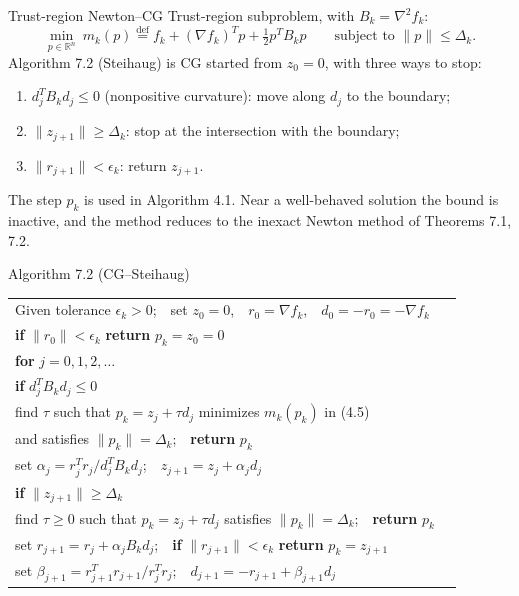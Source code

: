 \documentclass[aspectratio=169,12pt]{beamer}
\makeatletter
\newcommand{\R}{\mathbb{R}}
\newcommand{\gradf}{\nabla f}
\newcommand{\hessf}{\nabla^{2} f}
\newenvironment{algo}{\par\renewcommand{\arraystretch}{1.12}%
  \begin{tabular}{@{}l@{\hspace{2.2em}}l@{}}}{\end{tabular}\par}
\makeatother
\begin{document}
\begin{frame}{Trust-region Newton--CG}
  Trust-region subproblem, with $B_{k}=\hessf_{k}$:
  \[
    \min_{p\in\R^{n}}\ m_{k}(p)\overset{\text{def}}{=}f_{k}+(\gradf_{k})^{T}p+\tfrac12p^{T}B_{k}p
    \qquad\text{subject to }\|p\|\le\Delta_{k} .
    \tag{7.11}
  \]
  Algorithm 7.2 (Steihaug) is CG started from $z_{0}=0$, with three ways to stop:
  \begin{enumerate}\setlength\itemsep{0.3em}
    \item $d_{j}^{T}B_{k}d_{j}\le 0$ (nonpositive curvature): move along $d_{j}$ to the boundary;
    \item $\|z_{j+1}\|\ge\Delta_{k}$: stop at the intersection with the boundary;
    \item $\|r_{j+1}\|<\epsilon_{k}$: return $z_{j+1}$.
  \end{enumerate}

  \vspace{0.3em}
  The step $p_{k}$ is used in Algorithm 4.1. Near a well-behaved solution the bound is
  inactive, and the method reduces to the inexact Newton method of Theorems 7.1, 7.2.
\end{frame}

\begin{frame}{Algorithm 7.2 (CG--Steihaug)}
  \begin{block}{}\small
    \begin{algo}
      Given tolerance $\epsilon_{k}>0$;\ \ set $z_{0}=0$,\ \ $r_{0}=\gradf_{k}$,\ \ $d_{0}=-r_{0}=-\gradf_{k}$ & \\
      \textbf{if} $\|r_{0}\|<\epsilon_{k}$ \textbf{return} $p_{k}=z_{0}=0$ & \\
      \textbf{for} $j=0,1,2,\dots$ & \\
      \quad \textbf{if} $d_{j}^{T}B_{k}d_{j}\le 0$ & \\
      \qquad find $\tau$ such that $p_{k}=z_{j}+\tau d_{j}$ minimizes $m_{k}(p_{k})$ in (4.5) & \\
      \qquad and satisfies $\|p_{k}\|=\Delta_{k}$;\ \ \textbf{return} $p_{k}$ & \\
      \quad set $\alpha_{j}=r_{j}^{T}r_{j}/d_{j}^{T}B_{k}d_{j}$;\ \ $z_{j+1}=z_{j}+\alpha_{j}d_{j}$ & \\
      \quad \textbf{if} $\|z_{j+1}\|\ge\Delta_{k}$ & \\
      \qquad find $\tau\ge 0$ such that $p_{k}=z_{j}+\tau d_{j}$ satisfies $\|p_{k}\|=\Delta_{k}$;\ \
             \textbf{return} $p_{k}$ & \\
      \quad set $r_{j+1}=r_{j}+\alpha_{j}B_{k}d_{j}$;\ \ \textbf{if} $\|r_{j+1}\|<\epsilon_{k}$ \textbf{return} $p_{k}=z_{j+1}$ & \\
      \quad set $\beta_{j+1}=r_{j+1}^{T}r_{j+1}/r_{j}^{T}r_{j}$;\ \ $d_{j+1}=-r_{j+1}+\beta_{j+1}d_{j}$ & \\
    \end{algo}
  \end{block}
\end{frame}
\end{document}
